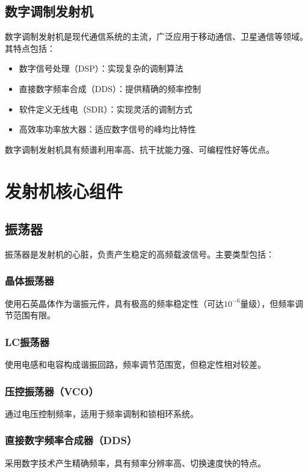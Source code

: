 \documentclass[12pt,UTF8]{ctexbook}
\begin{document}
\subsection{数字调制发射机}

数字调制发射机是现代通信系统的主流，广泛应用于移动通信、卫星通信等领域。其特点包括：

\begin{itemize}[leftmargin=3.5em]
    \item 数字信号处理（DSP）：实现复杂的调制算法
    \item 直接数字频率合成（DDS）：提供精确的频率控制
    \item 软件定义无线电（SDR）：实现灵活的调制方式
    \item 高效率功率放大器：适应数字信号的峰均比特性
\end{itemize}

数字调制发射机具有频谱利用率高、抗干扰能力强、可编程性好等优点。

\section{发射机核心组件}

\subsection{振荡器}

振荡器是发射机的心脏，负责产生稳定的高频载波信号。主要类型包括：

\subsubsection{晶体振荡器}
使用石英晶体作为谐振元件，具有极高的频率稳定性（可达$10^{-6}$量级），但频率调节范围有限。

\subsubsection{LC振荡器}
使用电感和电容构成谐振回路，频率调节范围宽，但稳定性相对较差。

\subsubsection{压控振荡器（VCO）}
通过电压控制频率，适用于频率调制和锁相环系统。

\subsubsection{直接数字频率合成器（DDS）}
采用数字技术产生精确频率，具有频率分辨率高、切换速度快的特点。
\end{document}
